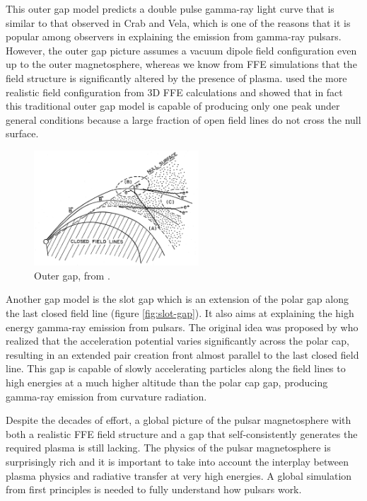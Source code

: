 This outer gap model predicts a double pulse gamma-ray light curve that is
similar to that observed in Crab and Vela, which is one of the reasons that it
is popular among observers in explaining the emission from gamma-ray pulsars.
However, the outer gap picture assumes a vacuum dipole field configuration even
up to the outer magnetosphere, whereas we know from FFE simulations that the
field structure is significantly altered by the presence of plasma.
\citet{bai_modeling_2010} used the more realistic field configuration from 3D
FFE calculations and showed that in fact this traditional outer gap model is
capable of producing only one peak under general conditions because a large
fraction of open field lines do not cross the null surface.

\begin{figure}[h]
  \centering
  \includegraphics[width=0.55\textwidth]{pics/intro/outer-gap.png}
  \caption[Outer gap]{Outer gap, from \citet{cheng_energetic_1986}.}
  \label{fig:outer-gap}
\end{figure}

Another gap model is the slot gap which is an extension of the polar gap along
the last closed field line (figure \ref{fig:slot-gap}). It also aims at
explaining the high energy gamma-ray emission from pulsars. The original idea
was proposed by \citet{arons_pair_1979} who realized that the acceleration
potential varies significantly across the polar cap, resulting in an extended
pair creation front almost parallel to the last closed field line. This gap is
capable of slowly accelerating particles along the field lines to high energies
at a much higher altitude than the polar cap gap, producing gamma-ray emission
from curvature radiation.

Despite the decades of effort, a global picture of the pulsar magnetosphere with
both a realistic FFE field structure and a gap that self-consistently generates
the required plasma is still lacking. The physics of the pulsar magnetosphere
is surprisingly rich and it is important to take into account the interplay
between plasma physics and radiative transfer at very high energies. A global
simulation from first principles is needed to fully understand how pulsars work.

